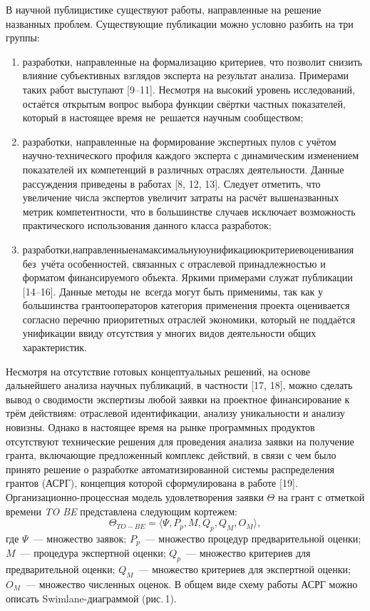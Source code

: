 В научной публицистике существуют работы, направленные на решение названных проблем. Существующие публикации можно условно разбить на три группы:
\begin{enumerate}[noitemsep]
  \item разработки, направленные на формализацию критериев, что позволит снизить влияние субъективных взглядов эксперта на результат анализа. Примерами таких работ выступают [9--11]. Несмотря на высокий уровень исследований, остаётся открытым вопрос выбора функции свёртки частных показателей, который в настоящее время не~решается научным сообществом;
  \item разработки, направленные на формирование экспертных пулов с учётом научно-технического профиля каждого эксперта с динамическим изменением показателей их компетенций в различных отраслях деятельности. Данные рассуждения приведены в работах [8, 12, 13]. Следует отметить, что увеличение числа экспертов увеличит затраты на расчёт вышеназванных метрик компетентности, что в большинстве случаев исключает возможность практического использования данного класса разработок;
  \item разработки,\;\;\;направленные\;\;на\;\;максимальную\;\;\;унификацию\;\;критериев\;\;оценивания без~учёта особенностей, связанных с отраслевой принадлежностью и форматом финансируемого объекта. Яркими примерами служат публикации [14--16]. Данные методы не~всегда могут быть применимы, так как у большинства грантооператоров категория применения проекта оценивается согласно перечню приоритетных отраслей экономики, который не поддаётся унификации ввиду отсутствия у многих видов деятельности общих характеристик.
\end{enumerate}

Несмотря на отсутствие готовых концептуальных решений, на основе дальнейшего анализа научных публикаций, в частности [17, 18], можно сделать вывод о сводимости экспертизы любой заявки на проектное финансирование к трём действиям: отраслевой идентификации, анализу уникальности и анализу новизны. Однако в настоящее время на рынке программных продуктов отсутствуют технические решения для проведения анализа заявки на получение гранта, включающие предложенный комплекс действий, в связи с чем было принято решение о разработке автоматизированной системы распределения грантов (АСРГ), концепция которой сформулирована в работе [19]. Организационно-процессная модель удовлетворения заявки $\Theta$ на грант с отметкой времени \textit{TO BE} представлена следующим кортежем:
\begin{equation}
  \Theta_{TO-BE} = \langle \Psi, P_p, M, Q_p, Q_M, O_M \rangle,
\end{equation}
где $\Psi$~--- множество заявок; $P_p$~--- множество процедур предварительной оценки; $M$~--- процедура экспертной оценки; $Q_p$~--- множество критериев для предварительной оценки; $Q_M$~--- множество критериев для экспертной оценки; $O_M$~--- множество численных оценок. В общем виде схему работы АСРГ можно описать Swimlane-диаграммой (рис.\,1).

